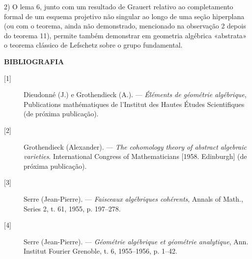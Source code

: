 2) O lema 6, junto com um resultado de Grauert relativo ao completamento
formal de um esquema projetivo não singular ao longo de uma seção
hiperplana (ou com o teorema, ainda não demonstrado, mencionado na
observação 2 depois do teorema 11), permite também demonstrar em geometria
algébrica «abstrata» o teorema clássico de Lefschetz sobre o grupo
fundamental.

\begin{center}
  \textbf{BIBLIOGRAFIA}
\end{center}

\begin{description}
  \item[{[1]}] Dieudonné (J.) e Grothendieck (A.). --- \emph{Éléments de
    géométrie algébrique}, Publications mathématiques de l'Institut des Hautes
    Études Scientifiques (de próxima publicação).
  \item[{[2]}] Grothendieck (Alexander). --- \emph{The cohomology theory of
    abstract algebraic varieties}. International Congress of Mathematicians
    [1958. Edinburgh] (de próxima publicação).
  \item[{[3]}] Serre (Jean-Pierre). --- \emph{Faisceaux algébriques
    cohérents}, Annals of Math., Series 2, t. 61, 1955, p. 197--278.
  \item[{[4]}] Serre (Jean-Pierre). --- \emph{Géométrie algébrique et
    géométrie analytique}, Ann. Institut Fourier Grenoble, t. 6, 1955--1956,
    p. 1--42.
\end{description}

\par
